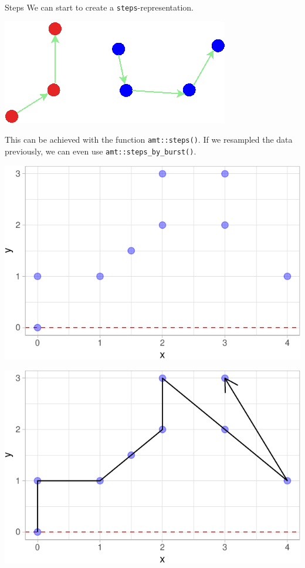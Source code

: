 \documentclass[ignorenonframetext,,t]{beamer}
\begin{document}
\begin{frame}[fragile]{Steps}
\label{steps}
We can start to create a \texttt{steps}-representation.

\begin{center}\includegraphics[width=0.5\linewidth]{img/steps} \end{center}

This can be achieved with the function \texttt{amt::steps()}. If we
resampled the data previously, we can even use
\texttt{amt::steps\_by\_burst()}.
\end{frame}

\begin{frame}
\begin{center}\includegraphics[width=0.85\linewidth]{01a_lecture_files/figure-beamer/unnamed-chunk-14-1} \end{center}
\end{frame}

\begin{frame}
\begin{center}\includegraphics[width=0.85\linewidth]{01a_lecture_files/figure-beamer/unnamed-chunk-15-1} \end{center}
\end{frame}
\end{document}
